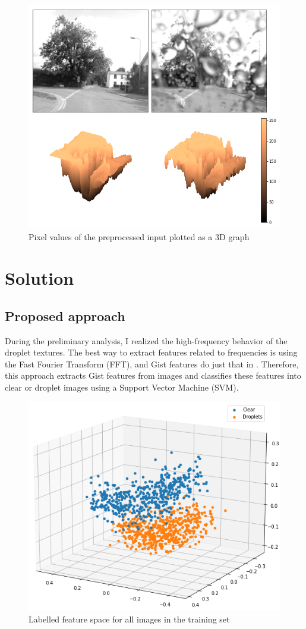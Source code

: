 \documentclass[conference]{IEEEtran}
\begin{document}
\begin{figure}[h!]
\centering
\includegraphics[width=0.87\linewidth]{images/frequency.png}
\caption{Pixel values of the preprocessed input plotted as a 3D graph}
\label{fig:frequency}
\end{figure}

\section{Solution}

\subsection{Proposed approach}
During the preliminary analysis, I realized the high-frequency behavior of the droplet textures. The best way to extract features related to frequencies is using the Fast Fourier Transform (FFT), and Gist features do just that in \cite{Oliva2001}. Therefore, this approach extracts Gist features from images and classifies these features into clear or droplet images using a Support Vector Machine (SVM).

\begin{figure}[h!]
\centering
\includegraphics[width=0.9\linewidth]{images/pca.png}
\caption{Labelled feature space for all images in the training set}
\label{fig:pca}
\end{figure}
\end{document}
